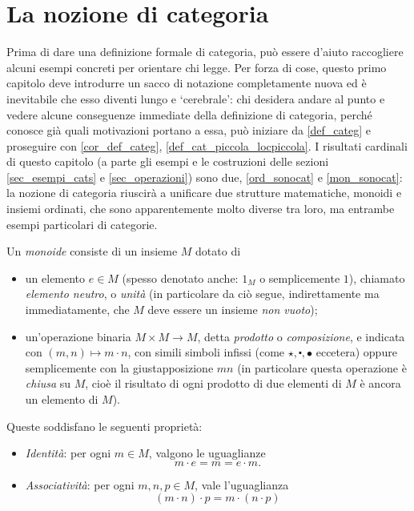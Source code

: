 \section{La nozione di categoria}\label{sec_categorie}

Prima di dare una definizione formale di categoria, può essere d'aiuto raccogliere alcuni esempi concreti per orientare chi legge. Per forza di cose, questo primo capitolo deve introdurre un sacco di notazione completamente nuova ed è inevitabile che esso diventi lungo e `cerebrale': chi desidera andare al punto e vedere alcune conseguenze immediate della definizione di categoria, perché conosce già quali motivazioni portano a essa, può iniziare da \ref{def_categ} e proseguire con \ref{cor_def_categ}, \ref{def_cat_piccola_locpiccola}. I risultati cardinali di questo capitolo (a parte gli esempi e le costruzioni delle sezioni \ref{sec_esempi_cats} e \ref{sec_operazioni}) sono due, \ref{ord_sonocat} e \ref{mon_sonocat}: la nozione di categoria riuscirà a unificare due strutture matematiche, monoidi e insiemi ordinati, che sono apparentemente molto diverse tra loro, ma entrambe esempi particolari di categorie.
\begin{definition}\label{prelim_def_monoide}
	Un \emph{monoide} consiste di un insieme \(M\) dotato di
	\begin{itemize}
		\item un elemento \(e\in M\) (spesso denotato anche: \(1_M\) o semplicemente \(1\)), chiamato \emph{elemento neutro}, o \emph{unità} (in particolare da ciò segue, indirettamente ma immediatamente, che \(M\) deve essere un insieme \emph{non vuoto});
		\item un'operazione binaria \(M\times M\to M\), detta \emph{prodotto} o \emph{composizione}, e indicata con \((m,n)\mapsto m\cdot n\), con simili simboli infissi (come \(\star, \centerdot,\bullet\) eccetera) oppure semplicemente con la giustapposizione	\(mn\) (in particolare questa operazione è \emph{chiusa} su \(M\), cioè il risultato di ogni prodotto di due elementi di \(M\) è ancora un elemento di \(M\)).
	\end{itemize}
	Queste soddisfano le seguenti proprietà:
	\begin{itemize}
		\item \emph{Identità}: per ogni \(m\in M\), valgono le uguaglianze
		      \[m\cdot e = m = e\cdot m.\]
		\item \emph{Associatività}: per ogni \(m,n,p\in M\), vale l'uguaglianza
		      \[(m\cdot n)\cdot p = m\cdot (n\cdot p)\]
	\end{itemize}
\end{definition}
